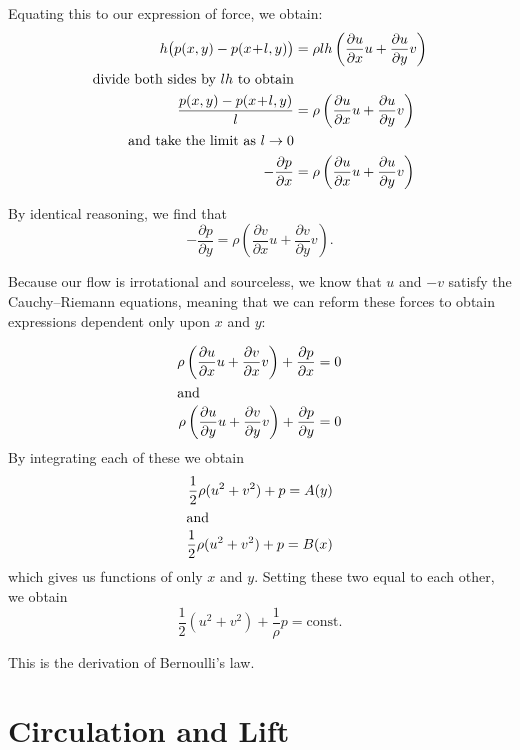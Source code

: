 \documentclass[letterpaper, twoside, 12 pt]{article}
\begin{document}
	Equating this to our expression of force, we obtain:
	\begin{align*}
		h \big( p(x, y) - p(x \!+\! l, y) \big) &= \rho lh \left( \frac{\partial u}{\partial x} u + \frac{\partial u}{\partial y} v \right)\\
		\text{divide both sides by $lh$ to obtain}\\
		\frac{p(x, y) - p(x \!+\! l, y)}{l} &= \rho \left( \frac{\partial u}{\partial x} u + \frac{\partial u}{\partial y} v \right) \\
		\text{and take the limit as $l \to 0$}\\
		- \frac{\partial p}{\partial x} &= \rho \left( \frac{\partial u}{\partial x} u + \frac{\partial u}{\partial y} v \right)
	\end{align*}
	
	By identical reasoning, we find that
	\[
		- \frac{\partial p}{\partial y} = \rho \left( \frac{\partial v}{\partial x} u + \frac{\partial v}{\partial y} v \right).
	\]
	
	Because our flow is irrotational and sourceless, we know that $u$ and $-v$ satisfy the Cauchy--Riemann equations, meaning that we can reform these forces to obtain expressions dependent only upon $x$ and $y$:

	\begin{align*}
		\rho \left( \frac{\partial u}{\partial x} u + \frac{\partial v}{\partial x} v \right) + \frac{\partial p}{\partial x} &= 0 \\
		\intertext{and}
		\rho \left( \frac{\partial u}{\partial y} u + \frac{\partial v}{\partial y} v \right) + \frac{\partial p}{\partial y} &= 0 \\
	\end{align*}
	By integrating each of these we obtain
	\begin{align*}
		\frac{1}{2} \rho (u^2 + v^2) + p = A(y) \\
		\intertext{and}
		\frac{1}{2} \rho (u^2 + v^2) + p = B(x) \\
	\end{align*}
	which gives us functions of only $x$ and $y$.
	Setting these two equal to each other, we obtain
	\[
		\frac{1}{2} (u^2 + v^2) + \frac{1}{\rho} p = \mathrm{const.}
	\]

	This is the derivation of Bernoulli's law.

\section{Circulation and Lift} %
\label{sec:circulation_and_lift}
\end{document}
